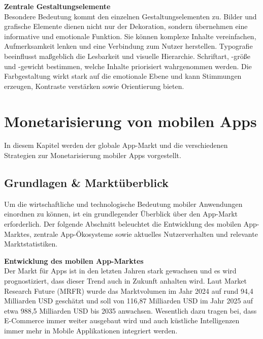 \textbf{Zentrale Gestaltungselemente}\\
Besondere Bedeutung kommt den einzelnen Gestaltungselementen zu. Bilder und grafische Elemente dienen nicht 
nur der Dekoration, sondern übernehmen eine informative und emotionale Funktion. Sie können komplexe Inhalte 
vereinfachen, Aufmerksamkeit lenken und eine Verbindung zum Nutzer herstellen. Typografie beeinflusst maßgeblich 
die Lesbarkeit und visuelle Hierarchie. Schriftart, -größe und -gewicht bestimmen, welche Inhalte priorisiert 
wahrgenommen werden. Die Farbgestaltung wirkt stark auf die emotionale Ebene und kann Stimmungen erzeugen, 
Kontraste verstärken sowie Orientierung bieten.\cite{Toolmaster_Design}\cite{StudySmarter_Visual_Design}\\

\section{Monetarisierung von mobilen Apps}
In diesem Kapitel werden der globale App-Markt und die verschiedenen Strategien zur Monetarisierung mobiler Apps vorgestellt.

\subsection{Grundlagen \& Marktüberblick}
Um die wirtschaftliche und technologische Bedeutung mobiler Anwendungen einordnen zu können, ist ein grundlegender Überblick über den App-Markt erforderlich. Der folgende Abschnitt beleuchtet die Entwicklung des mobilen App-Marktes, zentrale App-Ökosysteme sowie aktuelles Nutzerverhalten und relevante Marktstatistiken.

\textbf{Entwicklung des mobilen App-Marktes}\\
Der Markt für Apps ist in den letzten Jahren stark gewachsen und es wird prognostiziert, dass dieser Trend auch in Zukunft anhalten wird. Laut Market Research Future (MRFR) wurde das Marktvolumen im Jahr 2024 auf rund 94,4 Milliarden USD geschätzt und soll von 116,87 Milliarden USD im Jahr 2025 auf etwa 988,5 Milliarden USD bis 2035 anwachsen. Wesentlich dazu tragen bei, dass E-Commerce immer weiter ausgebaut wird und auch küstliche Intelligenzen immer mehr in Mobile Applikationen integriert werden.\cite{App_Markt_Entwicklung}\\
\vspace{0.5em}

